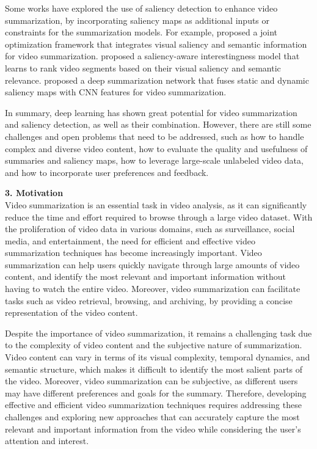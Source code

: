 \documentclass[14pt]{extarticle}
\begin{document}
    Some works have explored the use of saliency detection to enhance video summarization, by incorporating saliency maps as additional inputs or constraints for the summarization models. For example, \cite{ma2012video} proposed a joint optimization framework that integrates visual saliency and semantic information for video summarization. \cite{fu2014interestingness} proposed a saliency-aware interestingness model that learns to rank video segments based on their visual saliency and semantic relevance. \cite{rochan2018sequence} proposed a deep summarization network that fuses static and dynamic saliency maps with CNN features for video summarization.
    
    In summary, deep learning has shown great potential for video summarization and saliency detection, as well as their combination. However, there are still some challenges and open problems that need to be addressed, such as how to handle complex and diverse video content, how to evaluate the quality and usefulness of summaries and saliency maps, how to leverage large-scale unlabeled video data, and how to incorporate user preferences and feedback.

    \vspace{.5cm}
    \textbf{3. Motivation} \\
    Video summarization is an essential task in video analysis, as it can significantly reduce the time and effort required to browse through a large video dataset. With the proliferation of video data in various domains, such as surveillance, social media, and entertainment, the need for efficient and effective video summarization techniques has become increasingly important. Video summarization can help users quickly navigate through large amounts of video content, and identify the most relevant and important information without having to watch the entire video. Moreover, video summarization can facilitate tasks such as video retrieval, browsing, and archiving, by providing a concise representation of the video content.

    Despite the importance of video summarization, it remains a challenging task due to the complexity of video content and the subjective nature of summarization. Video content can vary in terms of its visual complexity, temporal dynamics, and semantic structure, which makes it difficult to identify the most salient parts of the video. Moreover, video summarization can be subjective, as different users may have different preferences and goals for the summary. Therefore, developing effective and efficient video summarization techniques requires addressing these challenges and exploring new approaches that can accurately capture the most relevant and important information from the video while considering the user's attention and interest.
\end{document}
